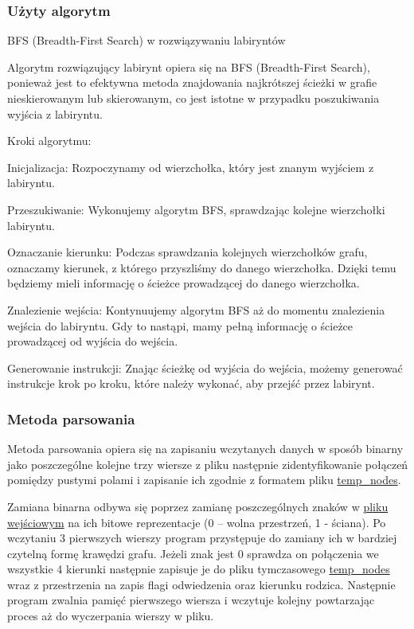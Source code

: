 \documentclass[
]{article}
\begin{document}
\hypertarget{uux17cyty-algorytm}{%
\subsubsection{Użyty algorytm}\label{uux17cyty-algorytm}}

BFS (Breadth-First Search) w rozwiązywaniu labiryntów

Algorytm rozwiązujący labirynt opiera się na BFS (Breadth-First Search),
ponieważ jest to efektywna metoda znajdowania najkrótszej ścieżki w
grafie nieskierowanym lub skierowanym, co jest istotne w przypadku
poszukiwania wyjścia z labiryntu.

Kroki algorytmu:

Inicjalizacja: Rozpoczynamy od wierzchołka, który jest znanym wyjściem z
labiryntu.

Przeszukiwanie: Wykonujemy algorytm BFS, sprawdzając kolejne wierzchołki
labiryntu.

Oznaczanie kierunku: Podczas sprawdzania kolejnych wierzchołków grafu,
oznaczamy kierunek, z którego przyszliśmy do danego wierzchołka. Dzięki
temu będziemy mieli informację o ścieżce prowadzącej do danego
wierzchołka.

Znalezienie wejścia: Kontynuujemy algorytm BFS aż do momentu znalezienia
wejścia do labiryntu. Gdy to nastąpi, mamy pełną informację o ścieżce
prowadzącej od wyjścia do wejścia.

Generowanie instrukcji: Znając ścieżkę od wyjścia do wejścia, możemy
generować instrukcje krok po kroku, które należy wykonać, aby przejść
przez labirynt.

\hypertarget{metoda-parsowania}{%
\subsubsection{Metoda parsowania}\label{metoda-parsowania}}

Metoda parsowania opiera się na zapisaniu wczytanych danych w sposób
binarny jako poszczególne kolejne trzy wiersze z pliku następnie
zidentyfikowanie połączeń pomiędzy pustymi polami i zapisanie ich
zgodnie z formatem pliku  \hyperref[pliki-tymczasowe] { temp\_nodes}.

Zamiana binarna odbywa się poprzez zamianę poszczególnych znaków w \hyperref[pliki-wejux15bciowe]{pliku
wejściowym} na ich bitowe reprezentacje (0
-- wolna przestrzeń, 1 - ściana). Po wczytaniu 3 pierwszych wierszy
program przystępuje do zamiany ich w bardziej czytelną formę krawędzi
grafu. Jeżeli znak jest 0 sprawdza on połączenia we wszystkie 4 kierunki
następnie zapisuje je do pliku tymczasowego \hyperref[pliki-tymczasowe] { temp\_nodes}
 wraz z przestrzenia na zapis flagi odwiedzenia
oraz kierunku rodzica. Następnie program zwalnia pamięć pierwszego
wiersza i wczytuje kolejny powtarzając proces aż do wyczerpania wierszy
w pliku.
\end{document}
